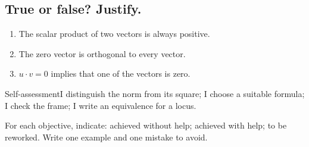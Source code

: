 \subsection*{True or false? Justify.}\label{C03-VF}
\begin{enumerate}
\item The scalar product of two vectors is always positive.
\item The zero vector is orthogonal to every vector.
\item $u\cdot v=0$ implies that one of the vectors is zero.
\end{enumerate}
\begin{repere}{Self-assessment}I distinguish the norm from its square; I choose a suitable formula; I check the frame; I write an equivalence for a locus.

For each objective, indicate: achieved without help; achieved with help; to be reworked. Write one example and one mistake to avoid.\end{repere}
\endgroup
\ifprof\fi
